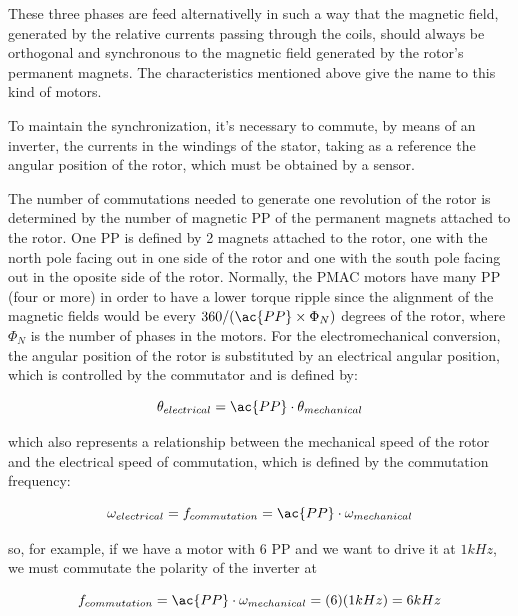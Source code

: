 These three phases are feed alternativelly in such a way that the magnetic field, generated by the relative currents passing through the coils, should always be orthogonal and synchronous to the magnetic field generated by the rotor's permanent magnets. The characteristics mentioned above give the name to this kind of motors. 

To maintain the synchronization, it's necessary to commute, by means of an inverter, the currents in the windings of the stator, taking as a reference the angular position of the rotor, which must be obtained by a sensor.

The number of commutations needed to generate one revolution of the rotor is determined by the number of magnetic \acf{PP} of the permanent magnets attached to the rotor. One \ac{PP} is defined by 2 magnets attached to the rotor, one with the north pole facing out in one side of the rotor and one with the south pole facing out in the oposite side of the rotor. Normally, the \ac{PMAC} motors have many \ac{PP} (four or more) in order to have a lower torque ripple since the alignment of the magnetic fields would be every $360/(\ac{PP} \times \Phi_{N})$ degrees of the rotor, where $\Phi_{N}$ is the number of phases in the motors. For the electromechanical conversion, the angular position of the rotor is substituted by an electrical angular position, which is controlled by the commutator and is defined by:

\begin{equation}
	\label{eq:pole_pairs}
	\theta_{electrical} = \ac{PP} \cdot \theta_{mechanical}
\end{equation}

which also represents a relationship between the mechanical speed of the rotor and the electrical speed of commutation, which is defined by the commutation frequency:

\begin{equation}
	\label{eq:pole_pairs}
	\omega_{electrical} = f_{commutation} = \ac{PP} \cdot \omega_{mechanical}
\end{equation}

so, for example, if we have a motor with 6 \ac{PP} and we want to drive it at $1 kHz$, we must commutate the polarity of the inverter at 

\begin{equation}
	f_{commutation} = \ac{PP} \cdot \omega_{mechanical} = (6) (1 kHz) = 6 kHz
\end{equation}

